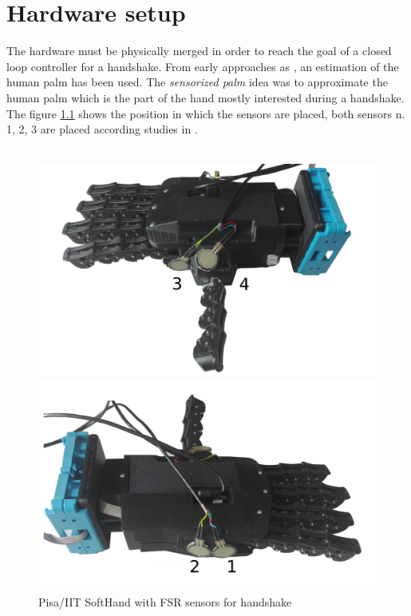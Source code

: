 \chapter{Hardware setup}
The hardware must be physically merged in order to reach the goal of a closed loop controller for a handshake. From early approaches as \cite{espen}, an estimation of the human palm has been used.  The \textit{sensorized palm} idea was to approximate the human palm which is the part of the hand mostly interested during a handshake.
The figure \ref{fig:sensorsONhand} shows the position in which the sensors are placed, both sensors n. 1, 2, 3 are placed according studies in \cite{espen}. \\ \\

\begin{figure}[h]
  \centering
  \begin{minipage}[b]{0.4\textwidth}
    \includegraphics[width=\textwidth]{Figure/qbhand1.png}
    
  \end{minipage}
  \hfill
  \begin{minipage}[b]{0.4\textwidth}
    \includegraphics[width=\textwidth]{Figure/qbhand2.png}
  \end{minipage}
  \label{fig:sensorsONhand}
  \caption{Pisa/IIT SoftHand with FSR sensors for handshake}
\end{figure}

